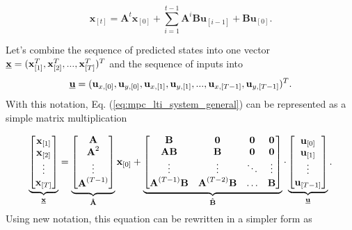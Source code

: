 \documentclass[a4paper,11pt,titlepage]{article}
\newcommand{\uvec}{\textbf{\underline{u}}}
\begin{document}
\begin{equation}
\label{eq:mpc_lti_system_general}
\textbf{x}_{[t]} =\textbf{A}^t\textbf{x}_{[0]} + 
\sum_{i = 1}^{t-1}\textbf{A}^{i}\textbf{B}\textbf{u}_{[i-1]} + \textbf{B} \textbf{u}_{[0]}.
\end{equation}

Let's combine the sequence of predicted states into one vector $\textbf{\underline{x}} = (\textbf{x}_{[1]}^T, \textbf{x}_{[2]}^T, ..., \textbf{x}_{[T]}^T)^T$ and the sequence of inputs into 
\begin{equation}
\uvec = (\textbf{u}_{x,[0]}, \textbf{u}_{y,[0]}, \textbf{u}_{x,[1]}, \textbf{u}_{y,[1]}, ..., \textbf{u}_{x,[T-1]}, \textbf{u}_{y,[T-1]})^T.
\end{equation}
With this notation, Eq. (\ref{eq:mpc_lti_system_general}) can be represented as a simple matrix multiplication

\begin{equation}
\label{eq:prediction_big}
\underbrace{
\begin{bmatrix}
\textbf{x}_{[1]} \\
\textbf{x}_{[2]} \\
\vdots \\
\textbf{x}_{[T]} \\
\end{bmatrix}}_{\textbf{\underline{x}}}
=
\underbrace{
\begin{bmatrix}
\textbf{A} \\
\textbf{A}^2 \\
\vdots \\
\textbf{A}^{(T-1)} \\
\end{bmatrix}}_{\textbf{\^A}}
\textbf{x}_{[0]}
+
\underbrace{
\begin{bmatrix}
\textbf{B} & \textbf{0} & \textbf{0} & \textbf{0} \\
\textbf{AB} & \textbf{B} & \textbf{0} & \textbf{0} \\
\vdots & \vdots & \ddots & \vdots \\
\textbf{A}^{(T-1)}\textbf{B} & \textbf{A}^{(T-2)}\textbf{B} & \hdots & \textbf{B}
\end{bmatrix}
}_{\textbf{\^B}}
\cdot
\underbrace{
\begin{bmatrix}
\textbf{u}_{[0]} \\
\textbf{u}_{[1]} \\
\vdots \\
\textbf{u}_{[T-1]} \\
\end{bmatrix}}_{\uvec}.
\end{equation}
Using new notation, this equation can be rewritten in a simpler form as
\end{document}
